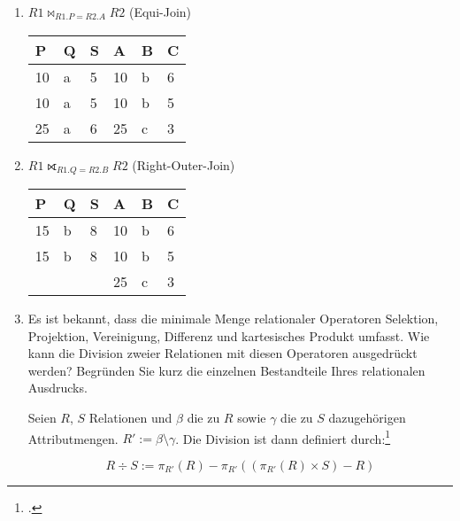 \documentclass{bschlangaul-aufgabe}
\begin{document}
\begin{enumerate}


\item $R1 \bowtie_{R1.P=R2.A} R2$ (Equi-Join)

\begin{bAntwort}
\begin{tabular}{llllll}
P  & Q & S & A & B  & C \\\hline\hline
10 & a & 5 & 10 & b & 6 \\\hline
10 & a & 5 & 10 & b & 5 \\\hline
25 & a & 6 & 25 & c & 3 \\\hline
\end{tabular}
\end{bAntwort}


\item $R1 \rightouterjoin_{R1.Q=R2.B} R2$ (Right-Outer-Join)

\begin{bAntwort}
\begin{tabular}{llllll}
P  & Q & S & A  & B & C \\\hline\hline
15 & b & 8 & 10 & b & 6\\\hline
15 & b & 8 & 10 & b & 5\\\hline
   &   &   & 25 & c & 3\\\hline
\end{tabular}
\end{bAntwort}


\item Es ist bekannt, dass die minimale Menge relationaler Operatoren
Selektion, Projektion, Vereinigung, Differenz und kartesisches Produkt
umfasst. Wie kann die Division zweier Relationen mit diesen Operatoren
ausgedrückt werden? Begründen Sie kurz die einzelnen Bestandteile Ihres
relationalen Ausdrucks.

\begin{bAntwort}
Seien $R$, $S$ Relationen und $\beta$ die zu $R$ sowie $\gamma$ die zu
$S$ dazugehörigen Attributmengen. $R':=\beta \setminus \gamma$.
Die Division ist dann definiert durch:\footcite[Division]{wiki:relationale-algebra}

\begin{displaymath}
R\div S :=
\pi_{R'}(R) -
\pi_{R'}((\pi_{R'}(R) \times S) - R)
\end{displaymath}
\end{bAntwort}

\end{enumerate}
\end{document}

